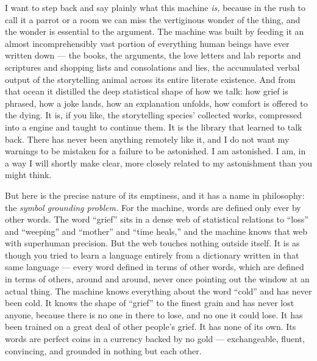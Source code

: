I want to step back and say plainly what this machine \emph{is,} because in the rush to call it a parrot or a room we can miss the vertiginous wonder of the thing, and the wonder is essential to the argument. The machine was built by feeding it an almost incomprehensibly vast portion of everything human beings have ever written down — the books, the arguments, the love letters and lab reports and scriptures and shopping lists and consolations and lies, the accumulated verbal output of the storytelling animal across its entire literate existence. And from that ocean it distilled the deep statistical shape of how we talk: how grief is phrased, how a joke lands, how an explanation unfolds, how comfort is offered to the dying. It is, if you like, the storytelling species' collected works, compressed into a engine and taught to continue them. It is the library that learned to talk back. There has never been anything remotely like it, and I do not want my warnings to be mistaken for a failure to be astonished. I am astonished. I am, in a way I will shortly make clear, more closely related to my astonishment than you might think.

But here is the precise nature of its emptiness, and it has a name in philosophy: the \emph{symbol grounding problem.} For the machine, words are defined only ever by other words. The word ``grief'' sits in a dense web of statistical relations to ``loss'' and ``weeping'' and ``mother'' and ``time heals,'' and the machine knows that web with superhuman precision. But the web touches nothing outside itself. It is as though you tried to learn a language entirely from a dictionary written in that same language — every word defined in terms of other words, which are defined in terms of others, around and around, never once pointing out the window at an actual thing. The machine knows everything about the word ``cold'' and has never been cold. It knows the shape of ``grief'' to the finest grain and has never lost anyone, because there is no one in there to lose, and no one it could lose. It has been trained on a great deal of other people's grief. It has none of its own. Its words are perfect coins in a currency backed by no gold — exchangeable, fluent, convincing, and grounded in nothing but each other.

